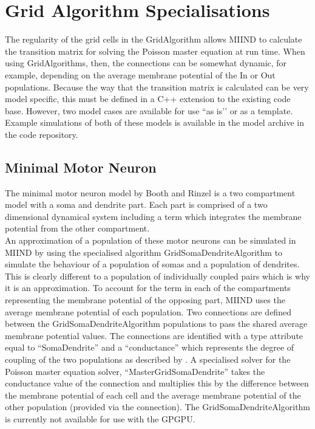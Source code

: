 \documentclass[utf8]{frontiers_suppmat} %
\begin{document}
\section{Grid Algorithm Specialisations}
\label{gridalgospec}
The regularity of the grid cells in the GridAlgorithm allows MIIND to calculate the transition matrix for solving the Poisson master equation at run time. When using GridAlgorithms, then, the connections can be somewhat dynamic, for example, depending on the average membrane potential of the In or Out populations. Because the way that the transition matrix is calculated can be very model specific, this must be defined in a C++ extension to the existing code base. However, two model cases are available for use ``as is’’ or as a template. Example simulations of both of these models is available in the model archive in the code repository.\\

\subsection{Minimal Motor Neuron}
The minimal motor neuron model by Booth and Rinzel \cite{booth1995minimal} is a two compartment model with a soma and dendrite part. Each part is comprised of a two dimensional dynamical system including a term which integrates the membrane potential from the other compartment. \\

An approximation of a population of these motor neurons can be simulated in MIIND by using the specialised algorithm GridSomaDendriteAlgorithm to simulate the behaviour of a population of somas and a population of dendrites. This is clearly different to a population of individually coupled pairs which is why it is an approximation. To account for the term in each of the compartments representing the membrane potential of the opposing part, MIIND uses the average membrane potential of each population. Two connections are defined between the GridSomaDendriteAlgorithm populations to pass the shared average membrane potential values. The connections are identified with a type attribute equal to ``SomaDendrite'' and a ``conductance'' which represents the degree of coupling of the two populations as described by \cite{booth1995minimal}. A specialised solver for the Poisson master equation solver, ``MasterGridSomaDendrite'' takes the conductance value of the connection and multiplies this by the difference between the membrane potential of each cell and the average membrane potential of the other population (provided via the connection). The GridSomaDendriteAlgorithm is currently not available for use with the GPGPU.\\
\\
\end{document}
